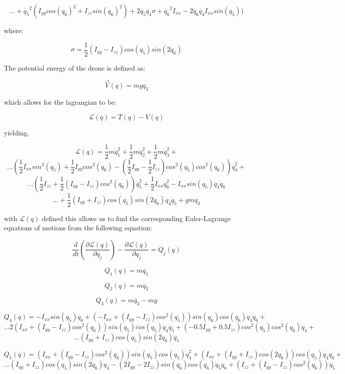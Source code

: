\documentclass[12pt, letterpaper]{article}
\begin{document}
\[
\ldots+\dot{q_{5}}^{2}(I_{yy}cos(q_{6})^{2}+I_{zz}sin(q_{6})^{2})+2\dot{q_{5}}\dot{q_{4}}\sigma+\dot{q_{6}}^{2}I_{xx}-2\dot{q_{6}}\dot{q_{4}}I_{xx}sin(q_{5}))
\]

where:

\[
\sigma=\frac{1}{2}(I_{yy}-I_{zz}){cos}(q_{5}){sin}(2q_{6})
\]

The potential energy of the drone is defined as:

\[
\overrightarrow{V}(q)=mgq_{3}
\]

which allows for the lagrangian to be:

\[
\mathcal{L}(q)=T(q)-V(q)
\]

yielding,

\[
\mathcal{L}(q) = \frac{1}{2} m \dot{q}_{1}^{2} + \frac{1}{2} m \dot{q}_{2}^{2} + \frac{1}{2} m \dot{q}_{3}^{2} + 
\]
\[
\ldots(\frac{1}{2} I_{xx} {sin}^{2}(q_{5}) + \frac{1}{2} I_{yy} {cos}^{2}(q_{6}) - (\frac{1}{2} I_{yy} - \frac{1}{2} I_{zz}) {cos}^{2}(q_{5}) {cos}^{2}(q_{6})) \dot{q}_{4}^{2} + 
\]
\[
\dots(\frac{1}{2} I_{zz} + \frac{1}{2} (I_{yy} - I_{zz}) {cos}^{2}(q_{6})) \dot{q}_{5}^{2} + \frac{1}{2} I_{xx} \dot{q}_{6}^{2} - I_{xx} {sin}(q_{5}) \dot{q}_{4} \dot{q}_{6} 
\]
\[
\ldots+ \frac{1}{2}(I_{yy} + I_{zz}) {cos}(q_{5}){sin}(2q_{6}) \dot{q}_{4} \dot{q}_{5}+ g m q_{3}
\]

with $\mathcal{L}(q)$ defined this allows us to find the corresponding
Euler-Lagrange equations of motions from the following equation:

\[
\frac{d}{dt}(\frac{\partial\mathcal{L}(q)}{\partial\dot{q_{j}}})-\frac{\partial\mathcal{L}(q)}{\partial q_{j}}=Q_{j}(q)
\]

\[
Q_{1}(q)=m\ddot{q_{1}}
\]

\[
Q_{2}(q)=m\ddot{q_{2}}
\]

\[
Q_{3}(q)=m\ddot{q_{3}}-mg
\]

\[
Q_{4}(q) = - I_{xx} {sin}(q_{5}) \ddot{q}_{6} + (- I_{xx} + (I_{yy} - I_{zz}) {cos}^{2}(q_{5})) {sin}(q_{6}) {cos}(q_{6}) \dot{q}_{4} \dot{q}_{6} + 
\]
\[
\ldots2 (I_{xx} + (I_{yy} - I_{zz}) {cos}^{2}(q_{6})) {sin}(q_{5}) {cos}(q_{5}) \dot{q}_{4} \dot{q}_{5} + (- 0.5 I_{yy} + 0.5 I_{zz}) {cos}^{2}(q_{5}) {cos}^{2}(q_{6}) \ddot{q}_{4} +
\]
\[ 
\ldots(I_{yy} + I_{zz}) {cos}(q_{5}) {sin}(2q_{6}) \ddot{q}_{5}
\]

\[
Q_{5}(q) =(I_{xx} + (I_{yy} - I_{zz}) {cos}^{2}(q_{6})) {sin}(q_{5}) {cos}(q_{5}) \dot{q}_{4}^{2} + (I_{xx} + (I_{yy} + I_{zz}) {cos}(2 q_{6})) {cos}(q_{5}) \dot{q}_{4} \dot{q}_{6} + 
\]
\[
\ldots(I_{yy} + I_{zz}) {cos}(q_{5}) {sin}(2q_{6}) \ddot{q}_{4} - (2 I_{yy} - 2 I_{zz}) {sin}(q_{6}) {cos}(q_{6}) \dot{q}_{5} \dot{q}_{6} + (I_{zz} + (I_{yy} - I_{zz}) {cos}^{2}(q_{6})) \ddot{q}_{5}
\]
\end{document}
